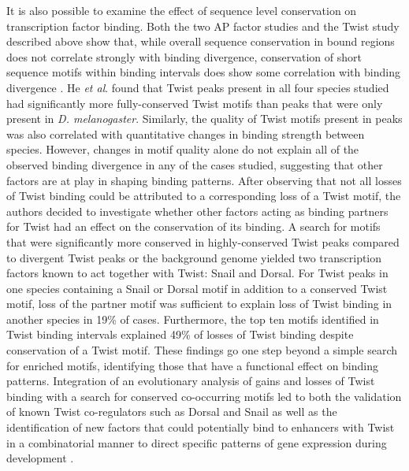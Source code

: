 It is also possible to examine the effect of sequence level conservation on transcription factor binding. Both the two AP factor studies and the Twist study described above show that, while overall sequence conservation in bound regions does not correlate strongly with binding divergence, conservation of short sequence motifs within binding intervals does show some correlation with binding divergence \citep{bradley_binding_2010,he_high_2011,paris_extensive_2013}. He \emph{et al}. found that Twist peaks present in all four species studied had significantly more fully-conserved Twist motifs than peaks that were only present in \emph{D. melanogaster}. Similarly, the quality of Twist motifs present in peaks was also correlated with quantitative changes in binding strength between species. However, changes in motif quality alone do not explain all of the observed binding divergence in any of the cases studied, suggesting that other factors are at play in shaping binding patterns. After observing that not all losses of Twist binding could be attributed to a corresponding loss of a Twist motif, the authors decided to investigate whether other factors acting as binding partners for Twist had an effect on the conservation of its binding. A search for motifs that were significantly more conserved in highly-conserved Twist peaks compared to divergent Twist peaks or the background genome yielded two transcription factors known to act together with Twist: Snail and Dorsal. For Twist peaks in one species containing a Snail or Dorsal motif in addition to a conserved Twist motif, loss of the partner motif was sufficient to explain loss of Twist binding in another species in 19\% of cases. Furthermore, the top ten motifs identified in Twist binding intervals explained 49\% of losses of Twist binding despite conservation of a Twist motif. These findings go one step beyond a simple search for enriched motifs, identifying those that have a functional effect on binding patterns. Integration of an evolutionary analysis of gains and losses of Twist binding with a search for conserved co-occurring motifs led to both the validation of known Twist co-regulators such as Dorsal and Snail as well as the identification of new factors that could potentially bind to enhancers with Twist in a combinatorial manner to direct specific patterns of gene expression during development \citep{he_high_2011}.

